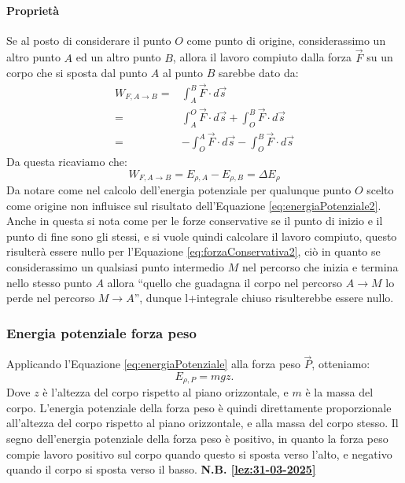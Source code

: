             \paragraph{Proprietà} Se al posto di considerare il punto $O$ come punto di origine, considerassimo un altro punto $A$ ed un altro punto $B$, allora il lavoro compiuto dalla forza $\vec{F}$ su un corpo che si sposta dal punto $A$ al punto $B$ sarebbe dato da:
            $$
                \begin{aligned}
                    W_{F,A\to B} =& \int_{A}^{B} \vec{F}\cdot d\vec{s}\\
                    =& \int_{A}^{O} \vec{F}\cdot d\vec{s} + \int_{O}^{B} \vec{F}\cdot d\vec{s}\\
                    =& -\int_{O}^{A} \vec{F}\cdot d\vec{s} - \int_{O}^{B} \vec{F}\cdot d\vec{s}
                \end{aligned}
            $$
            Da questa ricaviamo che:
            \begin{equation}
                W_{F,A\to B}=E_{\rho, A} - E_{\rho,B} = \Delta E_{\rho} \label{eq:energiaPotenziale2}
            \end{equation}
            Da notare come nel calcolo dell'energia potenziale per qualunque punto $O$ scelto come origine non influisce sul risultato dell'Equazione \ref{eq:energiaPotenziale2}. Anche in questa si nota come per le forze conservative se il punto di inizio e il punto di fine sono gli stessi, e si vuole quindi calcolare il lavoro compiuto, questo risulterà essere nullo per l'Equazione \ref{eq:forzaConservativa2}, ciò in quanto se considerassimo un qualsiasi punto intermedio $M$ nel percorso che inizia e termina nello stesso punto $A$ allora ``quello che guadagna il corpo nel percorso $A\to M$ lo perde nel percorso $M\to A$'', dunque l+integrale chiuso risulterebbe essere nullo.
            \subsubsection{Energia potenziale forza peso}
                Applicando l'Equazione \ref{eq:energiaPotenziale} alla forza peso $\vec{P}$, otteniamo:
                \begin{equation}
                    E_{\rho, P} = mgz.
                \end{equation}
                Dove $z$ è l'altezza del corpo rispetto al piano orizzontale, e $m$ è la massa del corpo. L'energia potenziale della forza peso è quindi direttamente proporzionale all'altezza del corpo rispetto al piano orizzontale, e alla massa del corpo stesso. Il segno dell'energia potenziale della forza peso è positivo, in quanto la forza peso compie lavoro positivo sul corpo quando questo si sposta verso l'alto, e negativo quando il corpo si sposta verso il basso.\newline
                \textbf{N.B. \ref{lez:31-03-2025}}
